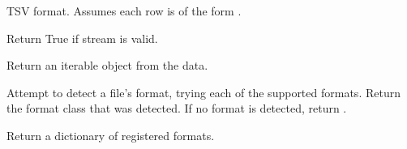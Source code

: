 \documentclass[letterpaper,10pt,english]{sphinxmanual}
\begin{document}
\begin{fulllineitems}
\label{api_reference:textblob.formats.TSV}
TSV format. Assumes each row is of the form .

\begin{fulllineitems}
\label{api_reference:textblob.formats.TSV.detect}
Return True if stream is valid.

\end{fulllineitems}


\begin{fulllineitems}
\label{api_reference:textblob.formats.TSV.to_iterable}
Return an iterable object from the data.

\end{fulllineitems}


\end{fulllineitems}


\begin{fulllineitems}
\label{api_reference:textblob.formats.detect}
Attempt to detect a file's format, trying each of the supported
formats. Return the format class that was detected. If no format is
detected, return .

\end{fulllineitems}


\begin{fulllineitems}
\label{api_reference:textblob.formats.get_registry}
Return a dictionary of registered formats.

\end{fulllineitems}

\end{document}
